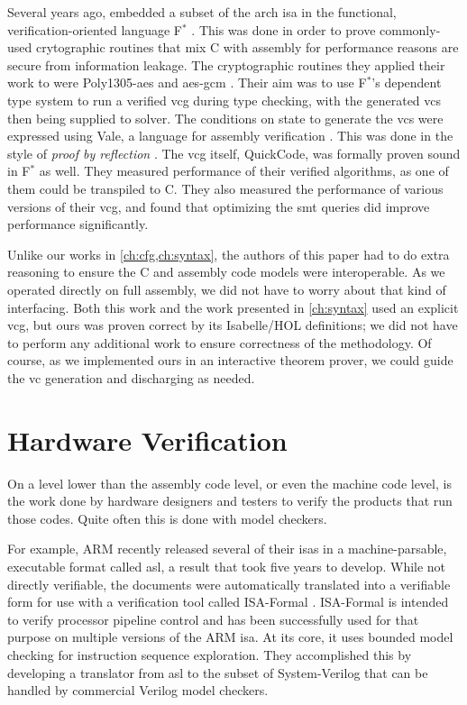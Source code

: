 Several years ago, \textcite{fromherz2019verified} embedded a subset
of the \gls{arch} \ac{isa} in the functional, verification-oriented language
F$^*$ \autocite{fstar}.
This was done in order to prove commonly-used crytographic routines
that mix C with assembly for performance reasons are secure from information leakage.
The cryptographic routines they applied their work to were
Poly1305-\ac{aes} \autocite{bernstein2005poly1305} and
\ac{aes}-\ac{gcm} \autocite{dworkin2007recommendation}.
Their aim was to use F$^*$'s dependent type system to run a verified \ac{vcg}
during type checking, with the generated \acp{vc}
then being supplied to  solver.
The conditions on state to generate the \acp{vc} were expressed using Vale,
a language for assembly verification \autocite{bond2017vale}.
This was done in the style of \emph{proof by reflection} \autocite{bertot2004reflection}.
The \ac{vcg} itself, QuickCode, was formally proven sound in F$^*$ as well.
They measured performance of their verified algorithms, as one of them could be
transpiled to C. They also measured the performance of various versions
of their \ac{vcg}, and found that optimizing the \ac{smt} queries did improve performance
significantly.

Unlike our works in \cref{ch:cfg,ch:syntax}, the authors of this paper
had to do extra reasoning to ensure the C and assembly code models were interoperable.
As we operated directly on full assembly, we did not have to worry about
that kind of interfacing. Both this work and the work presented in \cref{ch:syntax} used an explicit \ac{vcg},
but ours was proven correct by its Isabelle/HOL definitions;
we did not have to perform any additional work to ensure correctness
of the methodology.
Of course, as we implemented ours in an interactive theorem prover,
we could guide the \ac{vc} generation and discharging as needed.

\section{Hardware Verification}\label{se:hardware}
On a level lower than the assembly code level, or even the machine code level,
is the work done by hardware designers and testers
to verify the products that run those codes.
Quite often this is done with model checkers.

For example, ARM recently released several of their \acp{isa} in a machine-parsable,
executable format called \ac{asl}, a result that took five years to develop.
While not directly verifiable, the documents were automatically translated into
a verifiable form for use with a verification tool
called ISA-Formal \autocite{reid2016endtoend}.
ISA-Formal is intended to verify processor pipeline control
and has been successfully used for that purpose on multiple versions of the ARM \ac{isa}.
At its core, it uses bounded model checking for instruction sequence exploration.
They accomplished this by developing a translator from \ac{asl}
to the subset of System-Verilog that can be handled by commercial Verilog model checkers.

